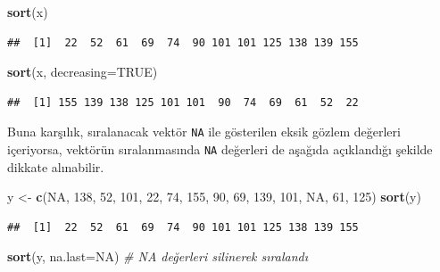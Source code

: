 \documentclass[
]{book}
\newenvironment{Shaded}{\begin{snugshade}}{\end{snugshade}}
\newcommand{\AttributeTok}[1]{\textcolor[rgb]{0.13,0.29,0.53}{#1}}
\newcommand{\CommentTok}[1]{\textcolor[rgb]{0.56,0.35,0.01}{\textit{#1}}}
\newcommand{\ConstantTok}[1]{\textcolor[rgb]{0.56,0.35,0.01}{#1}}
\newcommand{\DecValTok}[1]{\textcolor[rgb]{0.00,0.00,0.81}{#1}}
\newcommand{\FunctionTok}[1]{\textcolor[rgb]{0.13,0.29,0.53}{\textbf{#1}}}
\newcommand{\NormalTok}[1]{#1}
\newcommand{\OtherTok}[1]{\textcolor[rgb]{0.56,0.35,0.01}{#1}}
\begin{document}
\begin{Shaded}
\begin{Highlighting}[]
\FunctionTok{sort}\NormalTok{(x)}
\end{Highlighting}
\end{Shaded}

\begin{verbatim}
##  [1]  22  52  61  69  74  90 101 101 125 138 139 155
\end{verbatim}

\begin{Shaded}
\begin{Highlighting}[]
\FunctionTok{sort}\NormalTok{(x, }\AttributeTok{decreasing=}\ConstantTok{TRUE}\NormalTok{)}
\end{Highlighting}
\end{Shaded}

\begin{verbatim}
##  [1] 155 139 138 125 101 101  90  74  69  61  52  22
\end{verbatim}

Buna karşılık, sıralanacak vektör \texttt{NA} ile gösterilen eksik gözlem değerleri içeriyorsa, vektörün sıralanmasında \texttt{NA} değerleri de aşağıda açıklandığı şekilde dikkate alınabilir.

\begin{Shaded}
\begin{Highlighting}[]
\NormalTok{y }\OtherTok{\textless{}{-}} \FunctionTok{c}\NormalTok{(}\ConstantTok{NA}\NormalTok{, }\DecValTok{138}\NormalTok{,  }\DecValTok{52}\NormalTok{, }\DecValTok{101}\NormalTok{, }\DecValTok{22}\NormalTok{,  }\DecValTok{74}\NormalTok{, }\DecValTok{155}\NormalTok{,  }\DecValTok{90}\NormalTok{,  }\DecValTok{69}\NormalTok{, }\DecValTok{139}\NormalTok{, }\DecValTok{101}\NormalTok{, }\ConstantTok{NA}\NormalTok{,  }\DecValTok{61}\NormalTok{, }\DecValTok{125}\NormalTok{)}
\FunctionTok{sort}\NormalTok{(y)}
\end{Highlighting}
\end{Shaded}

\begin{verbatim}
##  [1]  22  52  61  69  74  90 101 101 125 138 139 155
\end{verbatim}

\begin{Shaded}
\begin{Highlighting}[]
\FunctionTok{sort}\NormalTok{(y, }\AttributeTok{na.last=}\ConstantTok{NA}\NormalTok{)         }\CommentTok{\# NA değerleri silinerek sıralandı }
\end{Highlighting}
\end{Shaded}
\end{document}
